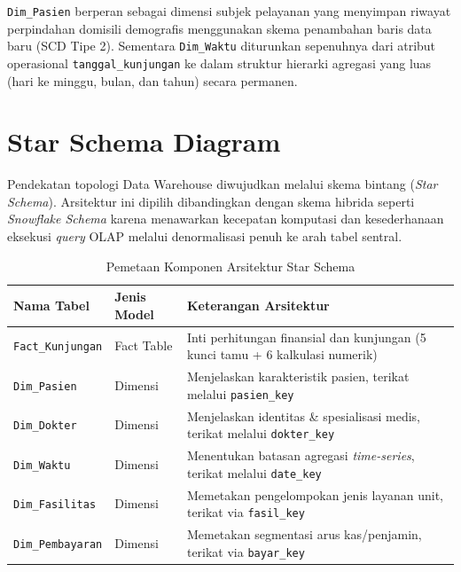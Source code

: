 \texttt{Dim\_Pasien} berperan sebagai dimensi subjek pelayanan yang menyimpan riwayat perpindahan domisili demografis menggunakan skema penambahan baris data baru (SCD Tipe 2). Sementara \texttt{Dim\_Waktu} diturunkan sepenuhnya dari atribut operasional \texttt{tanggal\_kunjungan} ke dalam struktur hierarki agregasi yang luas (hari ke minggu, bulan, dan tahun) secara permanen.
 
\section{Star Schema Diagram}
 
Pendekatan topologi Data Warehouse diwujudkan melalui skema bintang (\textit{Star Schema}). Arsitektur ini dipilih dibandingkan dengan skema hibrida seperti \textit{Snowflake Schema} karena menawarkan kecepatan komputasi dan kesederhanaan eksekusi \textit{query} OLAP melalui denormalisasi penuh ke arah tabel sentral.
 
\begin{table}[H]
\centering
\caption{Pemetaan Komponen Arsitektur Star Schema}
\begin{tabularx}{\linewidth}{p{3.5cm}p{2.5cm}X}
\toprule
\textbf{Nama Tabel} & \textbf{Jenis Model} & \textbf{Keterangan Arsitektur} \\
\midrule
\texttt{Fact\_Kunjungan}  & Fact Table & Inti perhitungan finansial dan kunjungan (5 kunci tamu + 6 kalkulasi numerik) \\
\texttt{Dim\_Pasien}      & Dimensi    & Menjelaskan karakteristik pasien, terikat melalui \texttt{pasien\_key} \\
\texttt{Dim\_Dokter}      & Dimensi    & Menjelaskan identitas \& spesialisasi medis, terikat melalui \texttt{dokter\_key} \\
\texttt{Dim\_Waktu}       & Dimensi    & Menentukan batasan agregasi \textit{time-series}, terikat melalui \texttt{date\_key} \\
\texttt{Dim\_Fasilitas}   & Dimensi    & Memetakan pengelompokan jenis layanan unit, terikat via \texttt{fasil\_key} \\
\texttt{Dim\_Pembayaran}  & Dimensi    & Memetakan segmentasi arus kas/penjamin, terikat via \texttt{bayar\_key} \\
\bottomrule
\end{tabularx}
\end{table}
 
